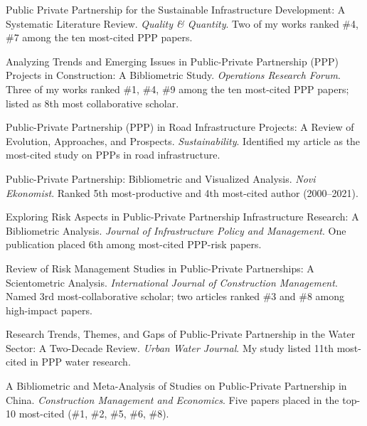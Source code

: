 \documentclass[11pt,a4paper]{report} %
\begin{document}
    \begin{tablist}

        \item[2025] \tab{}Public Private Partnership for the Sustainable Infrastructure Development: A Systematic Literature Review. \textit{Quality \& Quantity}. Two of my works ranked \#4, \#7 among the ten most-cited PPP papers. 
    
        \item[2024] \tab{}Analyzing Trends and Emerging Issues in Public-Private Partnership (PPP) Projects in Construction: A Bibliometric Study. \textit{Operations Research Forum}. Three of my works ranked \#1, \#4, \#9 among the ten most-cited PPP papers; listed as 8th most collaborative scholar.  
    
        \item[2024] \tab{}Public-Private Partnership (PPP) in Road Infrastructure Projects: A Review of Evolution, Approaches, and Prospects. \textit{Sustainability}. Identified my article as the most-cited study on PPPs in road infrastructure.  
    
        \item[2024] \tab{}Public-Private Partnership: Bibliometric and Visualized Analysis. \textit{Novi Ekonomist}. Ranked 5th most-productive and 4th most-cited author (2000--2021).  
    
        \item[2024] \tab{}Exploring Risk Aspects in Public-Private Partnership Infrastructure Research: A Bibliometric Analysis. \textit{Journal of Infrastructure Policy and Management}. One publication placed 6th among most-cited PPP-risk papers.  
    
        \item[2023] \tab{}Review of Risk Management Studies in Public-Private Partnerships: A Scientometric Analysis. \textit{International Journal of Construction Management}. Named 3rd most-collaborative scholar; two articles ranked \#3 and \#8 among high-impact papers.  
    
        \item[2022] \tab{}Research Trends, Themes, and Gaps of Public-Private Partnership in the Water Sector: A Two-Decade Review. \textit{Urban Water Journal}. My study listed 11th most-cited in PPP water research.  
    
        \item[2021] \tab{}A Bibliometric and Meta-Analysis of Studies on Public-Private Partnership in China. \textit{Construction Management and Economics}. Five papers placed in the top-10 most-cited (\#1, \#2, \#5, \#6, \#8).  
    

\end{tablist}
\end{document}
